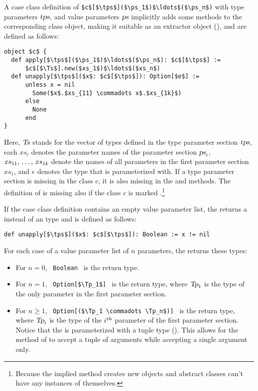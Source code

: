 A case class definition of \lstinline!$c$[$\tps$]($\ps_1$)$\ldots$($\ps_n$)! with type parameters $\mbox{\sl tps}$, and value parameters $\mbox{\sl ps}$ implicitly adds some methods to the corresponding class object, making it suitable as an extractor object (), and are defined as follows:
\begin{lstlisting}
object $c$ {
  def apply[$\tps$]($\ps_1$)$\ldots$($\ps_n$): $c$[$\tps$] := 
      $c$[$\Ts$].new($xs_1$)$\ldots$($xs_n$)
  def unapply[$\tps$]($x$: $c$[$\tps$]): Option[$e$] :=
      unless x = nil
        Some($x$.$xs_{11} \commadots x$.$xs_{1k}$)
      else
        None
      end
}
\end{lstlisting}

Here, $\mbox{\sl Ts}$ stands for the vector of types defined in the type parameter section $\mbox{\sl tps}$, each $xs_i$ denotes the parameter names of the parameter section $\mbox{\sl ps}_i$, $xs_{11} ,\, \ldots ,\, xs_{1k}$ denote the names of all parameters in the first parameter section $xs_1$, and $e$ denotes the type that  is parameterized with. If a type parameter section is missing in the class $c$, it is also missing in the  and  methods. The definition of  is missing also if the class $c$ is marked .\footnote{Because the implied  method creates new objects and abstract classes can't have any instances of themselves.}

If the case class definition contains an empty value parameter list, the  returns a  instead of an  type and is defined as follows:
\begin{lstlisting}
def unapply[$\tps$]($x$: $c$[$\tps$]): Boolean := x != nil
\end{lstlisting}

For each case of a value parameter list of $n$ parameters, the  returns these types: 
\begin{itemize}
\item
For $n = 0$, ~\lstinline!Boolean!~ is the return type. 

\item
For $n = 1$, ~\lstinline!Option[$\Tp_1$]!~ is the return type, where $\mbox{\sl Tp}_1$ is the type of the only parameter in the first parameter section. 

\item
For $n \geq 1$, ~\lstinline!Option[($\Tp_1 \commadots \Tp_n$)]!~ is the return type, where $\mbox{\sl Tp}_i$ is the type of the $i^{\mbox{\scriptsize th}}$ parameter of the first parameter section. Notice that the  is parameterized with a tuple type (). This allows for the  method of  to accept a tuple of arguments while accepting a single argument only. 
\end{itemize}

